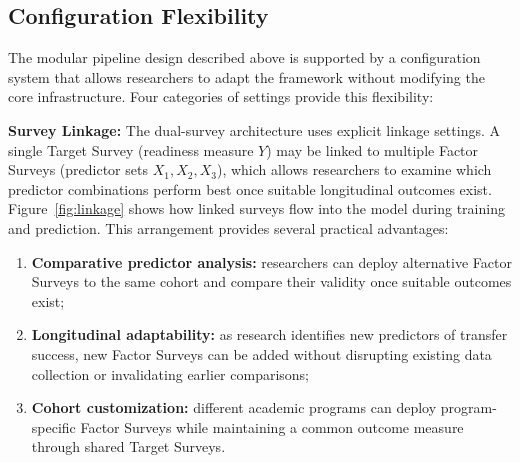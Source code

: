 \documentclass[letterpaper,11pt]{article}
\begin{document}
\begin{figure}[htbp]
{
}%
\end{figure}

\subsection{Configuration Flexibility}\label{subsec:config}

The modular pipeline design described above is supported by a configuration system that allows researchers to adapt the framework without modifying the core infrastructure. Four categories of settings provide this flexibility:

\textbf{Survey Linkage:} The dual-survey architecture uses explicit linkage settings. A single Target Survey (readiness measure $Y$) may be linked to multiple Factor Surveys (predictor sets $X_1, X_2, X_3$), which allows researchers to examine which predictor combinations perform best once suitable longitudinal outcomes exist. Figure~\ref{fig:linkage} shows how linked surveys flow into the model during training and prediction. This arrangement provides several practical advantages:

\begin{enumerate}
    \item \textbf{Comparative predictor analysis:} researchers can deploy alternative Factor Surveys to the same cohort and compare their validity once suitable outcomes exist;
    \item \textbf{Longitudinal adaptability:} as research identifies new predictors of transfer success, new Factor Surveys can be added without disrupting existing data collection or invalidating earlier comparisons;
    \item \textbf{Cohort customization:} different academic programs can deploy program-specific Factor Surveys while maintaining a common outcome measure through shared Target Surveys.
\end{enumerate}
\end{document}
